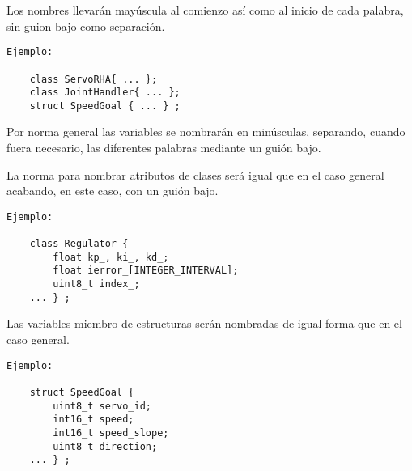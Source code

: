 
Los nombres llevarán mayúscula al comienzo así como al inicio de cada palabra, sin guion bajo como separación.
\\ 

    \lstset{language=C, breaklines=true, basicstyle=\footnotesize}
    \begin{lstlisting}[frame=single]
Ejemplo: 
    
    class ServoRHA{ ... };
    class JointHandler{ ... };
    struct SpeedGoal { ... } ;

    \end{lstlisting}
    

	Por norma general las variables se nombrarán en minúsculas, separando, cuando fuera necesario, las diferentes palabras mediante un guión bajo.
    
   
La norma para nombrar atributos de clases será igual que en el caso general acabando, en este caso, con un guión bajo.
\\ 

    \lstset{language=C, breaklines=true, basicstyle=\footnotesize}
    \begin{lstlisting}[frame=single]
Ejemplo: 
    
    class Regulator {
        float kp_, ki_, kd_;
        float ierror_[INTEGER_INTERVAL];
        uint8_t index_;    
    ... } ;

    \end{lstlisting}
    
 
Las variables miembro de estructuras serán nombradas de igual forma que en el caso general.
\\ 

    \lstset{language=C, breaklines=true, basicstyle=\footnotesize}
    \begin{lstlisting}[frame=single]
Ejemplo: 
    
    struct SpeedGoal {
        uint8_t servo_id;
        int16_t speed;
        int16_t speed_slope;
        uint8_t direction;  
    ... } ;

    \end{lstlisting}
    

